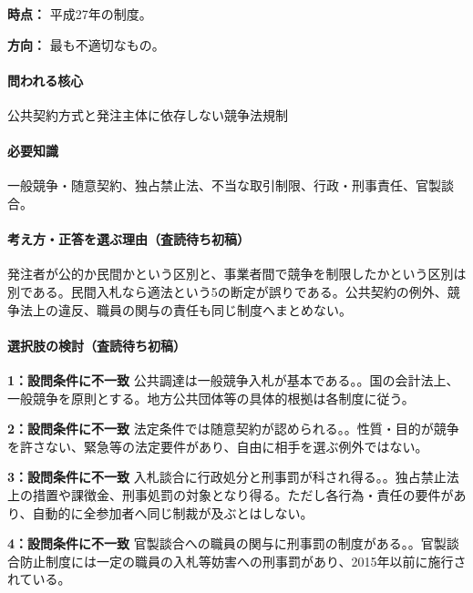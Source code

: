 \noindent\textbf{時点：} 平成27年の制度。\par

\noindent\textbf{方向：} 最も不適切なもの。\par

\paragraph{問われる核心} 公共契約方式と発注主体に依存しない競争法規制

\paragraph{必要知識} 一般競争・随意契約、独占禁止法、不当な取引制限、行政・刑事責任、官製談合。

\paragraph{考え方・正答を選ぶ理由（査読待ち初稿）} 発注者が公的か民間かという区別と、事業者間で競争を制限したかという区別は別である。民間入札なら適法という5の断定が誤りである。公共契約の例外、競争法上の違反、職員の関与の責任も同じ制度へまとめない。

\paragraph{選択肢の検討（査読待ち初稿）}\mbox{}\par

\noindent\textbf{1：設問条件に不一致} 公共調達は一般競争入札が基本である。。国の会計法上、一般競争を原則とする。地方公共団体等の具体的根拠は各制度に従う。\par

\noindent\textbf{2：設問条件に不一致} 法定条件では随意契約が認められる。。性質・目的が競争を許さない、緊急等の法定要件があり、自由に相手を選ぶ例外ではない。\par

\noindent\textbf{3：設問条件に不一致} 入札談合に行政処分と刑事罰が科され得る。。独占禁止法上の措置や課徴金、刑事処罰の対象となり得る。ただし各行為・責任の要件があり、自動的に全参加者へ同じ制裁が及ぶとはしない。\par

\noindent\textbf{4：設問条件に不一致} 官製談合への職員の関与に刑事罰の制度がある。。官製談合防止制度には一定の職員の入札等妨害への刑事罰があり、2015年以前に施行されている。\par

